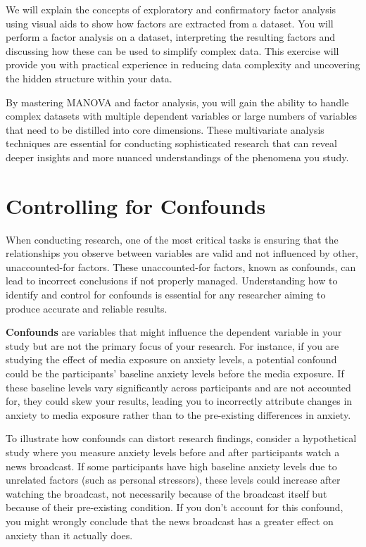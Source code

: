 \documentclass[
]{book}
\begin{document}
We will explain the concepts of exploratory and confirmatory factor analysis using visual aids to show how factors are extracted from a dataset. You will perform a factor analysis on a dataset, interpreting the resulting factors and discussing how these can be used to simplify complex data. This exercise will provide you with practical experience in reducing data complexity and uncovering the hidden structure within your data.

By mastering MANOVA and factor analysis, you will gain the ability to handle complex datasets with multiple dependent variables or large numbers of variables that need to be distilled into core dimensions. These multivariate analysis techniques are essential for conducting sophisticated research that can reveal deeper insights and more nuanced understandings of the phenomena you study.

\section{Controlling for Confounds}\label{controlling-for-confounds}

When conducting research, one of the most critical tasks is ensuring that the relationships you observe between variables are valid and not influenced by other, unaccounted-for factors. These unaccounted-for factors, known as confounds, can lead to incorrect conclusions if not properly managed. Understanding how to identify and control for confounds is essential for any researcher aiming to produce accurate and reliable results.

\textbf{Confounds} are variables that might influence the dependent variable in your study but are not the primary focus of your research. For instance, if you are studying the effect of media exposure on anxiety levels, a potential confound could be the participants' baseline anxiety levels before the media exposure. If these baseline levels vary significantly across participants and are not accounted for, they could skew your results, leading you to incorrectly attribute changes in anxiety to media exposure rather than to the pre-existing differences in anxiety.

To illustrate how confounds can distort research findings, consider a hypothetical study where you measure anxiety levels before and after participants watch a news broadcast. If some participants have high baseline anxiety levels due to unrelated factors (such as personal stressors), these levels could increase after watching the broadcast, not necessarily because of the broadcast itself but because of their pre-existing condition. If you don't account for this confound, you might wrongly conclude that the news broadcast has a greater effect on anxiety than it actually does.
\end{document}
